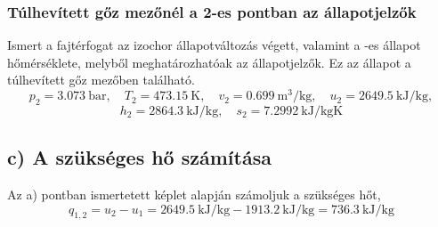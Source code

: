 \subsubsection{Túlhevített gőz mezőnél a 2-es pontban az állapotjelzők}
Ismert a fajtérfogat az izochor állapotváltozás végett, valamint a \raisebox{.5pt}{\textcircled{\raisebox{-.9pt} {2}}}-es állapot hőmérséklete, melyből meghatározhatóak az állapotjelzők. Ez az állapot a túlhevített gőz mezőben található.
\begin{equation}
	p_2=\SI{3,073}{\bar},
	\quad
	T_2=\SI{473,15}{\kelvin},
	\quad
	v_2=\SI{0,699}{\meter\cubed\per\kilogram},
	\quad
	u_2=\SI{2649,5}{\kilo\joule\per\kilogram},
\end{equation}
\begin{equation}
	h_2=\SI{2864,3}{\kilo\joule\per\kilogram},
	\quad
	s_2=\SI{7,2992}{\kilo\joule\per\kilogram\kelvin}
\end{equation}

\subsection*{c) A szükséges hő számítása}
Az a) pontban ismertetett képlet alapján számoljuk a szükséges hőt,
\begin{equation}
	q_{1,2}=u_2-u_1=\SI{2649,5}{\kilo\joule\per\kilogram}-\SI{1913,2}{\kilo\joule\per\kilogram}=\SI{736,3}{\kilo\joule\per\kilogram}
\end{equation}
